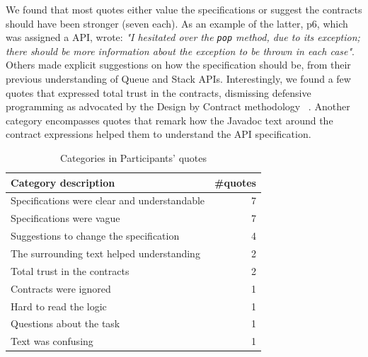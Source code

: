 We found that most quotes either value the specifications or suggest the contracts should have been stronger (seven each). As an example of the latter, p6, which was assigned a \contractjdoc{} API, wrote: \emph{"I hesitated over the \texttt{pop} method, due to its exception; there should be more information about the exception to be thrown in each case"}. 
Others made explicit suggestions on how the specification should be, from their previous understanding of Queue and Stack APIs.
Interestingly, we found a few quotes that expressed total trust in the contracts, dismissing defensive programming as advocated by the Design by Contract methodology ~\cite{dbc}.
Another category encompasses quotes that remark how the Javadoc text around the contract expressions helped them to understand the API specification. 

\begin{table}
\centering
\caption{Categories in Participants' quotes}
\label{tab:categories}
\begin{tabular}{|l|r|} 
\hline
\textbf{Category description}                & \multicolumn{1}{l|}{\textbf{\#quotes}}  \\ 
\hline\hline
Specifications were clear and understandable & 7                                       \\ 
\hline
Specifications were vague                    & 7                                       \\ 
\hline
Suggestions to change the specification      & 4                                       \\ 
\hline
The surrounding text helped understanding    & 2                                       \\ 
\hline
Total trust in the contracts                 & 2                                       \\ 
\hline
Contracts were ignored                       & 1                                       \\ 
\hline
Hard to read the logic                       & 1                                       \\ 
\hline
Questions about the task                     & 1                                       \\ 
\hline
Text was confusing                           & 1                                       \\
\hline
\end{tabular}
\end{table}


